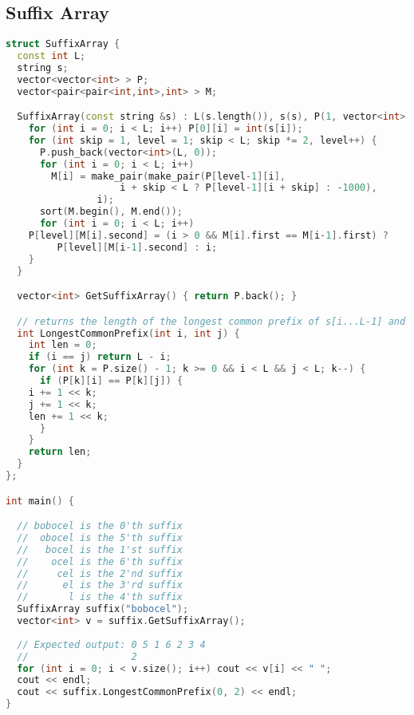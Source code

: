 \subsection{Suffix Array}
\begin{lstlisting}[language=C++]
struct SuffixArray {
  const int L;
  string s;
  vector<vector<int> > P;
  vector<pair<pair<int,int>,int> > M;

  SuffixArray(const string &s) : L(s.length()), s(s), P(1, vector<int>(L, 0)), M(L) {
    for (int i = 0; i < L; i++) P[0][i] = int(s[i]);
    for (int skip = 1, level = 1; skip < L; skip *= 2, level++) {
      P.push_back(vector<int>(L, 0));
      for (int i = 0; i < L; i++) 
		M[i] = make_pair(make_pair(P[level-1][i],
					i + skip < L ? P[level-1][i + skip] : -1000),
				i);
      sort(M.begin(), M.end());
      for (int i = 0; i < L; i++) 
	P[level][M[i].second] = (i > 0 && M[i].first == M[i-1].first) ?
		 P[level][M[i-1].second] : i;
    }    
  }

  vector<int> GetSuffixArray() { return P.back(); }

  // returns the length of the longest common prefix of s[i...L-1] and s[j...L-1]
  int LongestCommonPrefix(int i, int j) {
    int len = 0;
    if (i == j) return L - i;
    for (int k = P.size() - 1; k >= 0 && i < L && j < L; k--) {
      if (P[k][i] == P[k][j]) {
	i += 1 << k;
	j += 1 << k;
	len += 1 << k;
      }
    }
    return len;
  }
};

int main() {

  // bobocel is the 0'th suffix
  //  obocel is the 5'th suffix
  //   bocel is the 1'st suffix
  //    ocel is the 6'th suffix
  //     cel is the 2'nd suffix
  //      el is the 3'rd suffix
  //       l is the 4'th suffix
  SuffixArray suffix("bobocel");
  vector<int> v = suffix.GetSuffixArray();
  
  // Expected output: 0 5 1 6 2 3 4
  //                  2
  for (int i = 0; i < v.size(); i++) cout << v[i] << " ";
  cout << endl;
  cout << suffix.LongestCommonPrefix(0, 2) << endl;
}

\end{lstlisting}
